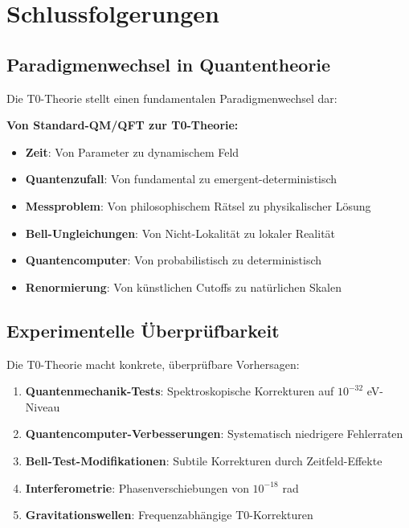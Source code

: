 	\section{Schlussfolgerungen}
	
	\subsection{Paradigmenwechsel in Quantentheorie}
	
	Die T0-Theorie stellt einen fundamentalen Paradigmenwechsel dar:
	
	\begin{tcolorbox}[colback=green!5!white,colframe=green!75!black,title=T0-Revolution]
		\textbf{Von Standard-QM/QFT zur T0-Theorie:}
		
		\begin{itemize}
			\item \textbf{Zeit}: Von Parameter zu dynamischem Feld
			\item \textbf{Quantenzufall}: Von fundamental zu emergent-deterministisch
			\item \textbf{Messproblem}: Von philosophischem Rätsel zu physikalischer Lösung
			\item \textbf{Bell-Ungleichungen}: Von Nicht-Lokalität zu lokaler Realität
			\item \textbf{Quantencomputer}: Von probabilistisch zu deterministisch
			\item \textbf{Renormierung}: Von künstlichen Cutoffs zu natürlichen Skalen
		\end{itemize}
	\end{tcolorbox}
	
	\subsection{Experimentelle Überprüfbarkeit}
	
	Die T0-Theorie macht konkrete, überprüfbare Vorhersagen:
	
	\begin{enumerate}
		\item \textbf{Quantenmechanik-Tests}: Spektroskopische Korrekturen auf $10^{-32}$ eV-Niveau
		\item \textbf{Quantencomputer-Verbesserungen}: Systematisch niedrigere Fehlerraten
		\item \textbf{Bell-Test-Modifikationen}: Subtile Korrekturen durch Zeitfeld-Effekte
		\item \textbf{Interferometrie}: Phasenverschiebungen von $10^{-18}$ rad
		\item \textbf{Gravitationswellen}: Frequenzabhängige T0-Korrekturen
	\end{enumerate}
	
